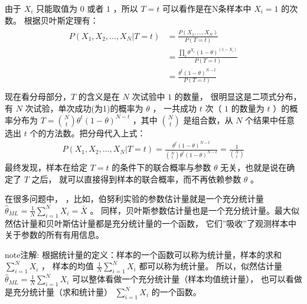 \documentclass[letterpaper,10pt,english]{sphinxmanual}
\begin{document}
\begin{sphinxShadowBox}

由于 \(X_i\) 只能取值为 \(0\) 或者 \(1\) ，所以 \(T=t\) 可以看作是在N条样本中 \(X_i=1\) 的次数。
根据贝叶斯定理有：
\begin{align}\label{equation:推断与检验/content:推断与检验/content:1}\!\begin{aligned}
P(X_1,X_2,\dots,X_N|T=t) &= \frac{P(X_1,\dots,X_N)}{P(T=t)}\\
&= \frac{\prod_i \theta^{X_i} (1-\theta)^{(1-X_i)} }{P(T=t)}\\
&= \frac{ \theta^t (1-\theta)^{N-t} }{P(T=t)}\\
\end{aligned}\end{align}
现在看分母部分，\(T\) 的含义是在 \(N\) 次试验中 \(1\) 的数量，
很明显这是二项式分布，有 \(N\) 次试验，单次成功(为1)的概率为 \(\theta\) ，
一共成功 \(t\) 次（ \(1\) 的数量为 \(t\) ）的概率分布为 \(T=\binom{N}{t}\theta^t (1-\theta)^{N-t}\)
，其中 \(\binom{N}{t}\) 是组合数，从 \(N\) 个结果中任意选出 \(t\) 个的方法数。把分母代入上式：
\begin{equation}\label{equation:推断与检验/content:推断与检验/content:2}
\begin{split}P(X_1,X_2,\dots,X_N|T=t) = \frac{ \theta^t (1-\theta)^{N-t} }{\binom{N}{t}\theta^t (1-\theta)^{N-t}}
= \frac{1}{\binom{N}{t}}\end{split}
\end{equation}
最终发现，样本在给定 \(T=t\) 的条件下的联合概率与参数 \(\theta\) 无关，也就是说在确定了 \(T\) 之后，
就可以直接得到样本的联合概率，而不再依赖参数 \(\theta\) 。
\end{sphinxShadowBox}

在很多问题中， ，比如，伯努利实验的参数估计量就是一个充分统计量
\(\hat{\theta}_{ML}=\frac{1}{N}\sum_{i=1}^N X_i=\bar{X}\) 。
同样，贝叶斯参数估计量也是一个充分统计量。最大似然估计量和贝叶斯估计量都是充分统计量的一个函数，
它们”吸收”了观测样本中关于参数的所有有用信息。

\begin{sphinxadmonition}{note}{注解:}
根据统计量的定义：样本的一个函数可以称为统计量，样本的求和 \(\sum_{i=1}^N X_i\) ，
样本的均值 \(\frac{1}{N}\sum_{i=1}^N X_i\) 都可以称为统计量。
所以，似然估计量 \(\hat{\theta}_{ML}=\frac{1}{N}\sum_{i=1}^N X_i\) 可以整体看做一个充分统计量（样本均值统计量），
也可以看做是充分统计量（求和统计量） \(\sum_{i=1}^N X_i\) 的一个函数。
\end{sphinxadmonition}
\end{document}
